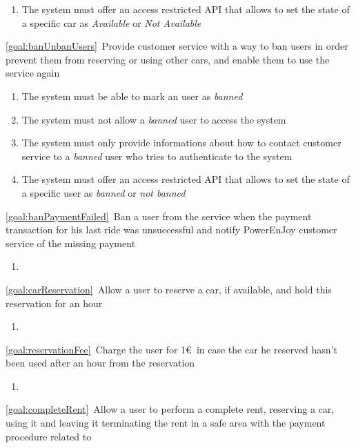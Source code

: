 \begin{description}
\begin{enumerate}[resume*]
   				\item The system must offer an access restricted API that allows to set the state of a
   				specific car as \textit{Available} or \textit{Not Available}
  			\end{enumerate}
  		\item \ref{goal:banUnbanUsers}\ Provide customer service with a way to ban users in order
  		prevent them from reserving or using other cars, and enable them to use the service again
  			\begin{enumerate}[resume*]
  				\item The system must be able to mark an user as \textit{banned}
  				\item The system must not allow a \textit{banned} user to access the system
   				\item The system must only provide informations about how to contact customer service
   				to a \textit{banned} user who tries to authenticate to the system
   				\item The system must offer an access restricted API that allows to set the state of a
   				specific user as \textit{banned} or \textit{not banned}
   			\end{enumerate}
  		\item \ref{goal:banPaymentFailed}\ Ban a user from the service when the payment transaction
  		for his last ride was unsuccessful and notify PowerEnJoy customer service of the missing
  		payment
  			\begin{enumerate}[resume*]
  				\item
  			\end{enumerate}
 	  	\item \ref{goal:carReservation}\ Allow a user to reserve a car, if available, and hold this
 	  	reservation for an hour
 	  		\begin{enumerate}[resume*]
 	  			\item
   			\end{enumerate}
  		\item \ref{goal:reservationFee}\ Charge the user for 1\euro\ in case the car he reserved hasn't
  		been used after an hour from the reservation
  			\begin{enumerate}[resume*]
  				\item
   			\end{enumerate}
  		\item \ref{goal:completeRent}\ Allow a user to perform a complete rent, reserving a car, using
  		it and leaving it terminating the rent in a safe area with the payment procedure related to

\end{description}
